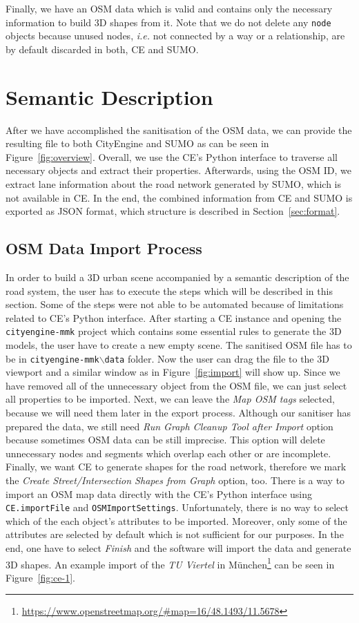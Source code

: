 Finally, we have an OSM data which is valid and contains only the necessary information to build 3D shapes from it. Note that we do not delete any \texttt{node} objects because unused nodes, \emph{i.e.} not connected by a way or a relationship, are by default discarded in both, CE and SUMO.

\section{Semantic Description}
After we have accomplished the sanitisation of the OSM data, we can provide the resulting file to both CityEngine and SUMO as can be seen in Figure~\ref{fig:overview}. Overall, we use the CE's Python interface to traverse all necessary objects and extract their properties. Afterwards, using the OSM ID, we extract lane information about the road network generated by SUMO, which is not available in CE. In the end, the combined information from CE and SUMO is exported as JSON format, which structure is described in Section~\ref{sec:format}. 

\subsection{OSM Data Import Process}
In order to build a 3D urban scene accompanied by a semantic description of the road system, the user has to execute the steps which will be described in this section. Some of the steps were not able to be automated because of limitations related to CE's Python interface. After starting a CE instance and opening the \texttt{cityengine-mmk} project which contains some essential rules to generate the 3D models, the user have to create a new empty scene. The sanitised OSM file has to be in \texttt{cityengine-mmk$\backslash$data} folder. Now the user can drag the file to the 3D viewport and a similar window as in Figure~\ref{fig:import} will show up. Since we have removed all of the unnecessary object from the OSM file, we can just select all properties to be imported. Next, we can leave the \emph{Map OSM tags} selected, because we will need them later in the export process. Although our sanitiser has prepared the data, we still need \emph{Run Graph Cleanup Tool after Import} option because sometimes OSM data can be still imprecise. This option will delete unnecessary nodes and segments which overlap each other or are incomplete. Finally, we want CE to generate shapes for the road network, therefore we mark the \emph{Create Street/Intersection Shapes from Graph} option, too. There is a way to import an OSM map data directly with the CE's Python interface using \texttt{CE.importFile} and \texttt{OSMImportSettings}. Unfortunately, there is no way to select which of the each object's attributes to be imported. Moreover, only some of the attributes are selected by default which is not sufficient for our purposes. In the end, one have to select \emph{Finish} and the software will import the data and generate 3D shapes. An example import of the \emph{TU Viertel} in M\"unchen\footnote{\url{https://www.openstreetmap.org/#map=16/48.1493/11.5678}} can be seen in Figure~\ref{fig:ce-1}.

